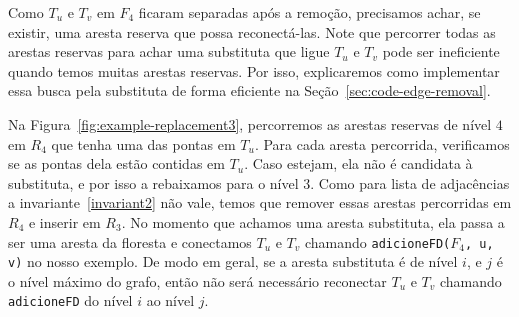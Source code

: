 \raggedbottom

Como $T_u$ e $T_v$ em $F_4$ ficaram separadas após a remoção, precisamos achar, se existir, uma aresta reserva que possa reconectá-las. Note que percorrer todas as arestas reservas para achar uma substituta que ligue $T_u$ e $T_v$ pode ser ineficiente quando temos muitas arestas reservas. Por isso, explicaremos como implementar essa busca pela substituta de forma eficiente na Seção~\ref{sec:code-edge-removal}. 

Na Figura~\ref{fig:example-replacement3}, percorremos as arestas reservas de nível $4$ em $R_4$ que tenha uma das pontas em $T_u$. Para cada aresta percorrida, verificamos se as pontas dela estão contidas em $T_u$. Caso estejam, ela não é candidata à substituta, e por isso a rebaixamos para o nível $3$. Como para lista de adjacências a invariante~\ref{invariant2} não vale, temos que remover essas arestas percorridas em $R_4$ e inserir em $R_3$. No momento que achamos uma aresta substituta, ela passa a ser uma aresta da floresta e conectamos $T_u$ e $T_v$ chamando \texttt{adicioneFD($F_4$, u, v)} no nosso exemplo. De modo em geral, se a aresta substituta é de nível $i$, e $j$ é o nível máximo do grafo, então não será necessário reconectar $T_u$ e $T_v$ chamando \texttt{adicioneFD} do nível $i$ ao nível $j$.



